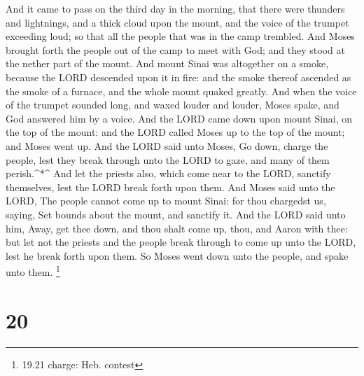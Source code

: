  And it came to pass on the third day in the morning, that
there were thunders and lightnings, and a thick cloud upon the mount,
and the voice of the trumpet exceeding loud; so that all the people that
was in the camp trembled.  And Moses brought forth the
people out of the camp to meet with God; and they stood at the nether
part of the mount.  And mount Sinai was altogether on a
smoke, because the LORD descended upon it in fire: and the smoke thereof
ascended as the smoke of a furnace, and the whole mount quaked greatly.
 And when the voice of the trumpet sounded long, and waxed
louder and louder, Moses spake, and God answered him by a voice.
 And the LORD came down upon mount Sinai, on the top of the
mount: and the LORD called Moses up to the top of the mount; and Moses
went up.  And the LORD said unto Moses, Go down, charge the
people, lest they break through unto the LORD to gaze, and many of them
perish.\^{}*\^{}  And let the priests also, which come near
to the LORD, sanctify themselves, lest the LORD break forth upon them.
 And Moses said unto the LORD, The people cannot come up to
mount Sinai: for thou chargedst us, saying, Set bounds about the mount,
and sanctify it.  And the LORD said unto him, Away, get
thee down, and thou shalt come up, thou, and Aaron with thee: but let
not the priests and the people break through to come up unto the LORD,
lest he break forth upon them.  So Moses went down unto the
people, and spake unto them. \footnote{19.21 charge: Heb. contest}

\hypertarget{section-19}{%
\section{20}\label{section-19}}

